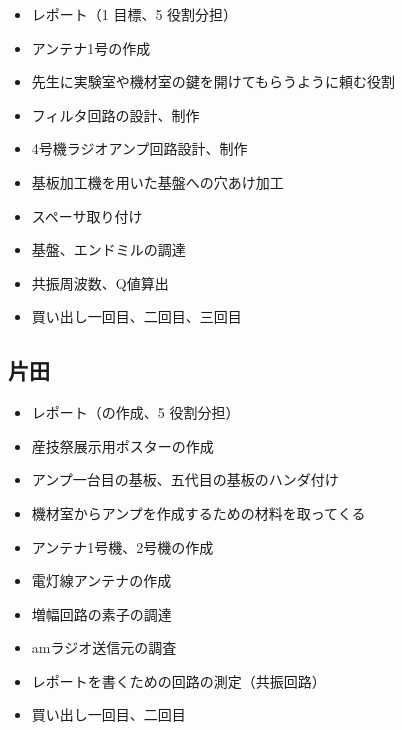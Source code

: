\documentclass[report.tex]{subfiles}
\begin{document}
\begin{itemize}
	\item レポート（1 目標、5 役割分担）
	\item アンテナ1号の作成
	\item 先生に実験室や機材室の鍵を開けてもらうように頼む役割
	\item フィルタ回路の設計、制作
	\item 4号機ラジオアンプ回路設計、制作
	\item 基板加工機を用いた基盤への穴あけ加工
	\item スペーサ取り付け
	\item 基盤、エンドミルの調達
	\item 共振周波数、Q値算出
	\item 買い出し一回目、二回目、三回目
\end{itemize}

\subsection{片田}

\begin{itemize}
	\item レポート（の作成、5 役割分担）
	\item 産技祭展示用ポスターの作成
	\item アンプ一台目の基板、五代目の基板のハンダ付け
	\item 機材室からアンプを作成するための材料を取ってくる
	\item アンテナ1号機、2号機の作成
	\item 電灯線アンテナの作成
	\item 増幅回路の素子の調達
	\item amラジオ送信元の調査
	\item レポートを書くための回路の測定（共振回路）
	\item 買い出し一回目、二回目
\end{itemize}
\end{document}
